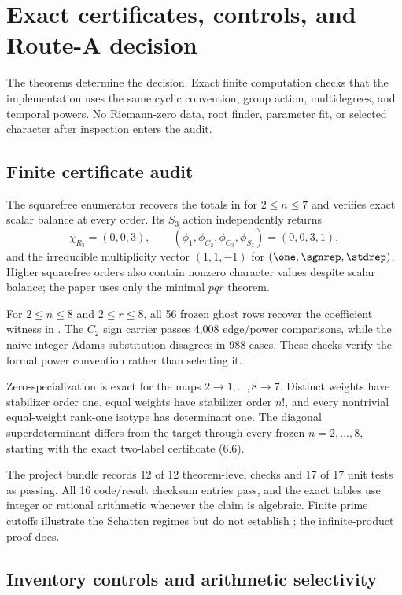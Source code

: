 \section{Exact certificates, controls, and Route-A decision}
\label{sec:controls}

The theorems determine the decision.  Exact finite computation checks that
the implementation uses the same cyclic convention, group action,
multidegrees, and temporal powers.  No Riemann-zero data, root finder,
parameter fit, or selected character after inspection enters the audit.

\subsection{Finite certificate audit}

The squarefree enumerator recovers the totals in
 for $2\le n\le7$ and verifies exact scalar
balance at every order.  Its $S_3$ action independently returns
\[
  \chi_{R_3}=(0,0,3),\qquad
  (\phi_1,\phi_{C_2},\phi_{C_3},\phi_{S_3})=(0,0,3,1),
  \tag{8.1}
\]
and the irreducible multiplicity vector $(1,1,-1)$ for
$(\one,\sgnrep,\stdrep)$.  Higher squarefree orders also contain nonzero
character values despite scalar balance; the paper uses only the minimal
$pqr$ theorem.

For $2\le n\le8$ and $2\le r\le8$, all 56 frozen ghost rows recover the
coefficient witness in .  The $C_2$ sign carrier
passes 4,008 edge/power comparisons, while the naive integer-Adams
substitution disagrees in 988 cases.  These checks verify the formal power
convention rather than selecting it.

Zero-specialization is exact for the maps $2\to1,\ldots,8\to7$.  Distinct
weights have stabilizer order one, equal weights have stabilizer order $n!$,
and every nontrivial equal-weight rank-one isotype has determinant one.  The
diagonal superdeterminant differs from the target through every frozen
$n=2,\ldots,8$, starting with the exact two-label certificate (6.6).

The project bundle records 12 of 12 theorem-level checks and 17 of 17 unit
tests as passing.  All 16 code/result checksum entries pass, and the exact
tables use integer or rational arithmetic whenever the claim is algebraic.
Finite prime cutoffs illustrate the Schatten regimes but do not establish
; the infinite-product proof does.

\subsection{Inventory controls and arithmetic selectivity}

